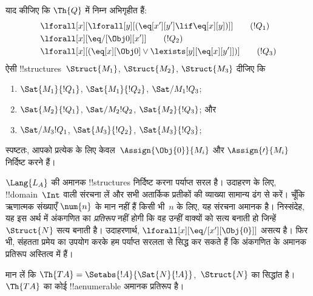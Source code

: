 \documentclass[../../../include/open-logic-section]{subfiles}
\begin{document}
\begin{prob}
याद कीजिए कि $\Th{Q}$ में निम्न अभिगृहीत हैं:
\begin{align*}
& \lforall[x][\lforall[y][(\eq[x'][y'] \lif \eq[x][y])]] \tag{$!Q_1$}\\
& \lforall[x][\eq/[\Obj 0][x']] \tag{$!Q_2$}\\
& \lforall[x][(\eq[x][\Obj 0] \lor \lexists[y][\eq[x][y']])] \tag{$!Q_3$}
\end{align*}
ऐसी !!{structure}s~$\Struct{M_1}$, $\Struct{M_2}$, $\Struct{M_3}$ दीजिए
कि
\begin{enumerate}
\item $\Sat{M_1}{!Q_1}$, $\Sat{M_1}{!Q_2}$, $\Sat/{M_1}{!Q_3}$;
\item $\Sat{M_2}{!Q_1}$, $\Sat/{M_2}{!Q_2}$, $\Sat{M_2}{!Q_3}$; और
\item $\Sat/{M_3}{!Q_1}$, $\Sat{M_3}{!Q_2}$, $\Sat{M_3}{!Q_3}$;
\end{enumerate}
स्पष्टतः, आपको प्रत्येक के लिए केवल~$\Assign{\Obj{0}}{M_i}$ और
$\Assign{\prime}{M_i}$ निर्दिष्ट करने हैं।
\end{prob}

\begin{explain}
$\Lang{L_A}$ की अमानक !!{structure}s निर्दिष्ट करना पर्याप्त सरल है। उदाहरण
के लिए, !!{domain}~$\Int$ वाली संरचना लें और सभी अतार्किक प्रतीकों की
व्याख्या सामान्य ढंग से करें। चूँकि ऋणात्मक संख्याएँ $\num{n}$ के मान नहीं
हैं किसी भी~$n$ के लिए, यह संरचना अमानक है। निस्संदेह, यह इस अर्थ में
अंकगणित का \emph{प्रतिरूप} नहीं होगी कि वह उन्हीं वाक्यों को सत्य बनाती हो
जिन्हें~$\Struct{N}$ सत्य बनाती है। उदाहरणार्थ,
$\lforall[x][\eq/[x'][\Obj{0}]]$ असत्य है। फिर भी, संहतता प्रमेय का उपयोग
करके हम पर्याप्त सरलता से सिद्ध कर सकते हैं कि अंकगणित के अमानक प्रतिरूप
अस्तित्व में हैं।
\end{explain}

\begin{prop}
मान लें कि $\Th{TA} = \Setabs{!A}{\Sat{N}{!A}}$,~$\Struct{N}$ का
सिद्धांत है। $\Th{TA}$ का कोई !!a{enumerable} अमानक प्रतिरूप है।
\end{prop}
\end{document}
